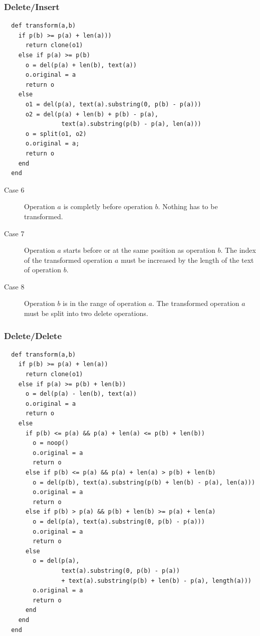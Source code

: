 \subsubsection{Delete/Insert}

\small{\begin{verbatim}
  def transform(a,b)
    if p(b) >= p(a) + len(a)))
      return clone(o1)
    else if p(a) >= p(b)
      o = del(p(a) + len(b), text(a))
      o.original = a
      return o
    else
      o1 = del(p(a), text(a).substring(0, p(b) - p(a)))
      o2 = del(p(a) + len(b) + p(b) - p(a), 
                text(a).substring(p(b) - p(a), len(a)))
      o = split(o1, o2)
      o.original = a;
      return o
    end
  end
\end{verbatim}}

\begin{description}
 \item[Case 6] Operation $a$ is completly before operation $b$. Nothing has to be transformed.
 \item[Case 7] Operation $a$ starts before or at the same position as operation $b$. The index of the transformed operation $a$ must be increased by the length of the text of operation $b$.
 \item[Case 8] Operation $b$ is in the range of operation $a$. The transformed operation $a$ must be split into two delete operations.
\end{description}


\subsubsection{Delete/Delete}

\small{\begin{verbatim}
  def transform(a,b)
    if p(b) >= p(a) + len(a))
      return clone(o1)
    else if p(a) >= p(b) + len(b))
      o = del(p(a) - len(b), text(a))
      o.original = a
      return o
    else
      if p(b) <= p(a) && p(a) + len(a) <= p(b) + len(b))
        o = noop()
        o.original = a
        return o
      else if p(b) <= p(a) && p(a) + len(a) > p(b) + len(b)
        o = del(p(b), text(a).substring(p(b) + len(b) - p(a), len(a)))
        o.original = a
        return o
      else if p(b) > p(a) && p(b) + len(b) >= p(a) + len(a)
        o = del(p(a), text(a).substring(0, p(b) - p(a)))
        o.original = a
        return o
      else
        o = del(p(a), 
                text(a).substring(0, p(b) - p(a)) 
                + text(a).substring(p(b) + len(b) - p(a), length(a)))
        o.original = a
        return o
      end
    end
  end
\end{verbatim}}

